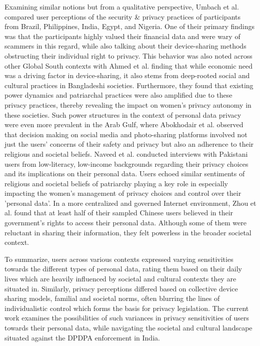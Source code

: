 Examining similar notions but from a qualitative perspective, Umbach et al. \cite{umbach_your_2023} compared user perceptions of the security \& privacy practices of participants from Brazil, Philippines, India, Egypt, and Nigeria. One of their primary findings was that the participants highly valued their financial data and were wary of scammers in this regard, while also talking about their device-sharing methods obstructing their individual right to privacy. This behavior was also noted across other Global South contexts with Ahmed et al. \cite{ahmed_everyone_2019, ahmed_digital_2017} finding that while economic need was a driving factor in device-sharing, it also stems from deep-rooted social and cultural practices in Bangladeshi societies. Furthermore, they found that existing power dynamics and patriarchal practices were also amplified due to these privacy practices, thereby revealing the impact on women's privacy autonomy in these societies. Such power structures in the context of personal data privacy were even more prevalent in the Arab Gulf, where Abokhodair et al. \cite{abokhodair_privacy_2016, abokhodair_photo_2017} observed that decision making on social media and photo-sharing platforms involved not just the users' concerns of their safety and privacy but also an adherence to their religious and societal beliefs. Naveed et al. \cite{naveed_ask_2022} conducted interviews with Pakistani users from low-literacy, low-income backgrounds regarding their privacy choices and its implications on their personal data. Users echoed similar sentiments of religious and societal beliefs of patriarchy playing a key role in especially impacting the women's management of privacy choices and control over their 'personal data'. In a more centralized and governed Internet environment, Zhou et al. \cite{zhou_understanding_2024} found that at least half of their sampled Chinese users believed in their government's rights to access their personal data. Although some of them were reluctant in sharing their information, they felt powerless in the broader societal context. 

To summarize, users across various contexts expressed varying sensitivities towards the different types of personal data, rating them based on their daily lives which are heavily influenced by societal and cultural contexts they are situated in. Similarly, privacy perceptions differed based on collective device sharing models, familial and societal norms, often blurring the lines of individualistic control which forms the basis for privacy legislation. The current work examines the possibilities of such variances in privacy sensitivities of users towards their personal data, while navigating the societal and cultural landscape situated against the DPDPA enforcement in India. 

